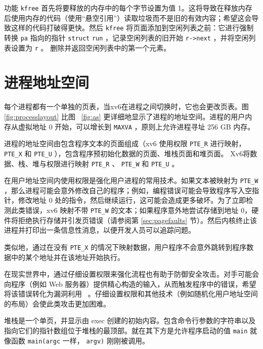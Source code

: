 \documentclass[UTF8]{article}
\begin{document}
功能
    \lstinline{kfree}   
        首先将要释放的内存中的每个字节设置为值 1。这将导致在释放内存后使用内存的代码（使用“悬空引用”）读取垃圾而不是旧的有效内容；希望这会导致这样的代码打破得更快。然后
    \lstinline{kfree}    将页面添加到空闲列表之前：它进行强制转换
    \lstinline{pa}    指向的指针
    \lstinline{struct}   
    \lstinline{run}    ，记录空闲列表的旧开始
    \lstinline{r->next}    ，并将空闲列表设置为
    \lstinline{r}   。
        删除并返回空闲列表中的第一个元素。  

   \section{进程地址空间  }     

每个进程都有一个单独的页表，当xv6在进程之间切换时，它也会更改页表。图~    \ref{fig:processlayout}    比图~    \ref{fig:as}    更详细地显示了进程的地址空间。进程的用户内存从虚拟地址 0 开始，可以增长到    \texttt{MAXVA}   
        ，原则上允许进程寻址 256 GB 内存。  

进程的地址空间由包含程序文本的页面组成（xv6 使用权限    \lstinline{PTE_R}    进行映射，
    \lstinline{PTE_X}    和    \lstinline{PTE_U}    ），包含程序预初始化数据的页面、堆栈页面和堆页面。 Xv6将数据、栈、堆与权限进行映射
    \lstinline{PTE_R}    、    \lstinline{PTE_W}    和    \lstinline{PTE_U}    。  

在用户地址空间内使用权限是强化用户进程的常用技术。如果文本被映射为
    \lstinline{PTE_W}    ，那么进程可能会意外修改自己的程序；例如，编程错误可能会导致程序写入空指针，修改地址 0 处的指令，然后继续运行，这可能会造成更多破坏。为了立即检测此类错误，xv6 映射不带    \lstinline{PTE_W}    的文本；如果程序意外地尝试存储到地址 0，硬件将拒绝执行存储并引发页错误（请参阅第    \ref{sec:pagefaults}    节）。然后内核终止该进程并打印出一条信息性消息，以便开发人员可以追踪问题。  

类似地，通过在没有    \lstinline{PTE_X}    的情况下映射数据，用户程序不会意外跳转到程序数据中的某个地址并在该地址开始执行。  

在现实世界中，通过仔细设置权限来强化流程也有助于防御安全攻击。对手可能会向程序（例如 Web 服务器）提供精心构造的输入，从而触发程序中的错误，希望将该错误转化为漏洞利用~    \cite{aleph:smashing}    。仔细设置权限和其他技术（例如随机化用户地址空间的布局）会使此类攻击更加困难。  

堆栈是一个单页，并显示由 exec 创建的初始内容。包含命令行参数的字符串以及指向它们的指针数组位于堆栈的最顶部。就在其下方是允许程序启动的值
    \lstinline{main}    就像函数    \lstinline{main(argc}    一样，
    \lstinline{argv)}    刚刚被调用。  
\end{document}
